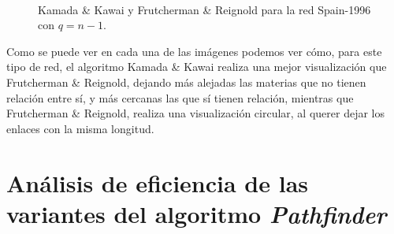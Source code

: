 \documentclass[paper=a4, fontsize=11pt]{article} %
\numberwithin{equation}{section} %
\numberwithin{figure}{section} %
\numberwithin{table}{section} %
\begin{document}
\begin{figure}[H]
    \centering
    \mbox {
      \qquad
    }
    \caption{Kamada \& Kawai y Frutcherman \& Reignold para la red Spain-1996 con $q=n-1$.}
    \label{spqN-1}
\end{figure}

Como se puede ver en cada una de las imágenes podemos ver cómo, para este tipo de red, el algoritmo Kamada \& Kawai realiza una mejor visualización que Frutcherman \& Reignold, dejando más alejadas las materias que no tienen relación entre sí, y más cercanas las que sí tienen relación, mientras que Frutcherman \& Reignold, realiza una visualización circular, al querer dejar los enlaces con la misma longitud.

\section{Análisis de eficiencia de las variantes del algoritmo \textit{Pathfinder}}
\end{document}
